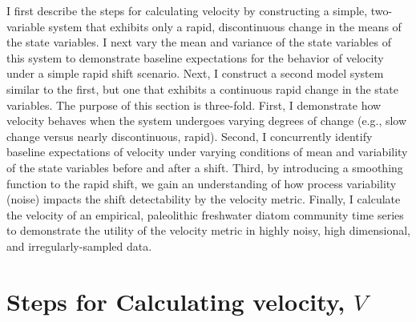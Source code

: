 \documentclass[12pt,twoside,openany]{reedthesis}
\begin{document}
I first describe the steps for calculating velocity by constructing a simple, two-variable system that exhibits only a rapid, discontinuous change in the means of the state variables. I next vary the mean and variance of the state variables of this system to demonstrate baseline expectations for the behavior of velocity under a simple rapid shift scenario. Next, I construct a second model system similar to the first, but one that exhibits a continuous rapid change in the state variables. The purpose of this section is three-fold. First, I demonstrate how velocity behaves when the system undergoes varying degrees of change (e.g., slow change versus nearly discontinuous, rapid). Second, I concurrently identify baseline expectations of velocity under varying conditions of mean and variability of the state variables before and after a shift. Third, by introducing a smoothing function to the rapid shift, we gain an understanding of how process variability (noise) impacts the shift detectability by the velocity metric. Finally, I calculate the velocity of an empirical, paleolithic freshwater diatom community time series to demonstrate the utility of the velocity metric in highly noisy, high dimensional, and irregularly-sampled data.

\hypertarget{steps-for-calculating-velocity-v}{%
\section{\texorpdfstring{Steps for Calculating velocity, \(V\)}{Steps for Calculating velocity, V}}\label{steps-for-calculating-velocity-v}}
\end{document}
